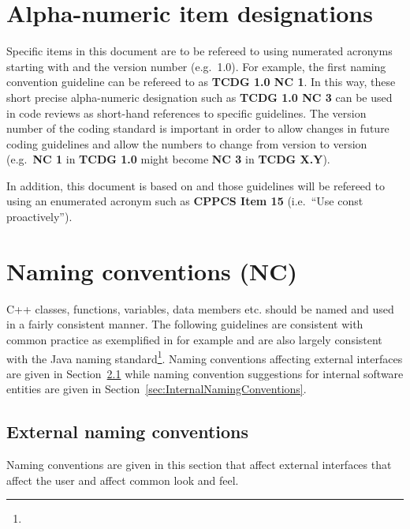 %
\section{Alpha-numeric item designations}
\label{sec:alpha_numeric_designations}
%

Specific items in this document are to be refereed to using numerated
acronyms starting with {}\textbf{} and the version number
(e.g.\ 1.0).  For example, the first naming convention guideline can
be refereed to as {}\textbf{TCDG 1.0 NC 1}.  In this way, these short
precise alpha-numeric designation such as {}\textbf{TCDG 1.0 NC 3} can
be used in code reviews as short-hand references to specific
guidelines.  The version number of the coding standard is important in
order to allow changes in future coding guidelines and allow the
numbers to change from version to version (e.g.\ {}\textbf{NC 1} in
{}\textbf{TCDG 1.0} might become {}\textbf{NC 3} in {}\textbf{TCDG
X.Y}).

In addition, this document is based on {}\cite{C++CodingStandards05}
and those guidelines will be refereed to using an enumerated acronym
such as {}\textbf{CPPCS Item 15} (i.e.\ ``Use const proactively'').

%
\section{Naming conventions (NC)}
\label{sec:NamingConventions}
%

C++ classes, functions, variables, data members etc. should be named
and used in a fairly consistent manner.  The following guidelines are
consistent with common practice as exemplified in
{}\cite{EffectiveC++3rd05} for example and are also largely consistent
with the Java naming standard\footnote{
{}}.
Naming conventions affecting external interfaces are given in
Section~\ref{sec:ExternalNamingConventions} while naming convention
suggestions for internal software entities are given in
Section~\ref{sec:InternalNamingConventions}.


%
\subsection{External naming conventions}
\label{sec:ExternalNamingConventions}
%

Naming conventions are given in this section that affect external
interfaces that affect the user and affect common look and feel.

